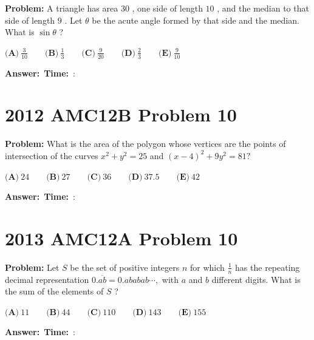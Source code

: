 \documentclass[12pt]{article}
\begin{document}
\textbf{Problem:}
A triangle has area $30$ , one side of length $10$ , and the median to that side of length $9$ . Let $\theta$ be the acute angle formed by that side and the median. What is $\sin{\theta}$ ?

$\textbf{(A)}\ \frac{3}{10}\qquad\textbf{(B)}\ \frac{1}{3}\qquad\textbf{(C)}\ \frac{9}{20}\qquad\textbf{(D)}\ \frac{2}{3}\qquad\textbf{(E)}\ \frac{9}{10}$

\vspace{0.3cm}
\noindent\textbf{Answer:}~\underline{\hspace{5cm}}\hfill\textbf{Time:}~\underline{\hspace{1.2cm}}:\underline{\hspace{1.2cm}}

\vspace{0.5cm}

\section{2012 AMC12B Problem 10}

\textbf{Problem:}
What is the area of the polygon whose vertices are the points of intersection of the curves $x^2 + y^2 =25$ and $(x-4)^2 + 9y^2 = 81 ?$

$\textbf{(A)}\ 24\qquad\textbf{(B)}\ 27\qquad\textbf{(C)}\ 36\qquad\textbf{(D)}\ 37.5\qquad\textbf{(E)}\ 42$

\vspace{0.3cm}
\noindent\textbf{Answer:}~\underline{\hspace{5cm}}\hfill\textbf{Time:}~\underline{\hspace{1.2cm}}:\underline{\hspace{1.2cm}}

\vspace{0.5cm}

\section{2013 AMC12A Problem 10}

\textbf{Problem:}
Let $S$ be the set of positive integers $n$ for which $\tfrac{1}{n}$ has the repeating decimal representation $0.\overline{ab} = 0.ababab\cdots,$ with $a$ and $b$ different digits. What is the sum of the elements of $S$ ?

$\textbf{(A)}\ 11\qquad\textbf{(B)}\ 44\qquad\textbf{(C)}\ 110\qquad\textbf{(D)}\ 143\qquad\textbf{(E)}\ 155\qquad$

\vspace{0.3cm}
\noindent\textbf{Answer:}~\underline{\hspace{5cm}}\hfill\textbf{Time:}~\underline{\hspace{1.2cm}}:\underline{\hspace{1.2cm}}

\vspace{0.5cm}
\end{document}
